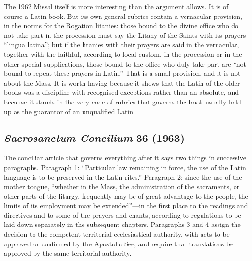 The 1962 Missal itself is more interesting than the argument allows. It is of course a Latin book. But its own general rubrics contain a vernacular provision, in the norms for the Rogation litanies: those bound to the divine office who do not take part in the procession must say the Litany of the Saints with its prayers ``lingua latina''; but if the litanies with their prayers are said in the vernacular, together with the faithful, according to local custom, in the procession or in the other special supplications, those bound to the office who duly take part are ``not bound to repeat these prayers in Latin.'' That is a small provision, and it is not about the Mass. It is worth having because it shows that the Latin of the older books was a discipline with recognised exceptions rather than an absolute, and because it stands in the very code of rubrics that governs the book usually held up as the guarantor of an unqualified Latin.

\subsection{\emph{Sacrosanctum Concilium} 36 (1963)}

The conciliar article that governs everything after it says two things in successive paragraphs. Paragraph 1: ``Particular law remaining in force, the use of the Latin language is to be preserved in the Latin rites.'' Paragraph 2: since the use of the mother tongue, ``whether in the Mass, the administration of the sacraments, or other parts of the liturgy, frequently may be of great advantage to the people, the limits of its employment may be extended''---in the first place to the readings and directives and to some of the prayers and chants, according to regulations to be laid down separately in the subsequent chapters. Paragraphs 3 and 4 assign the decision to the competent territorial ecclesiastical authority, with acts to be approved or confirmed by the Apostolic See, and require that translations be approved by the same territorial authority.

